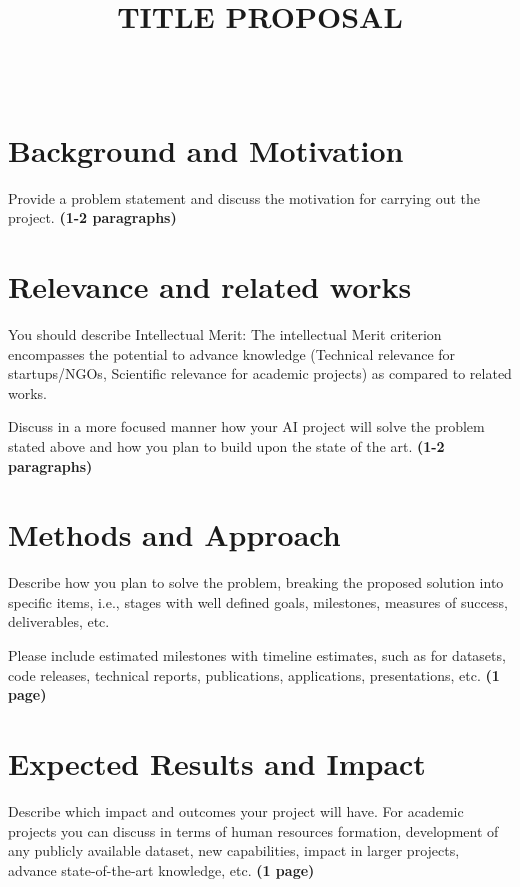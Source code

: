 \documentclass{lxaiproposal}
\title{TITLE PROPOSAL}
\author{\coord{PI FirstNAME}{PI FamilyNAME}{1} \\
       \coord{CO-PI FirstNAME}{CO-PI FamilyNAME}{2}
      }
\affil{2}{Affiliation 2, Address}}
\begin{document}
\maketitle
%
\section{Background and Motivation}
\vspace*{-3mm}

Provide a problem statement and discuss the motivation for carrying out the project. 
\textbf{(1-2 paragraphs)}

\section{Relevance and related works}
\vspace*{-3mm}

You should describe Intellectual Merit: The intellectual Merit criterion encompasses the potential to advance knowledge (Technical relevance for startups/NGOs, Scientific relevance for academic projects) as compared to related works.

Discuss in a more focused manner how your AI project will solve the problem stated above and how you plan to build upon the state of the art.
\textbf{(1-2 paragraphs)}


\section{Methods and Approach}
\vspace*{-3mm}

Describe how you plan to solve the problem, breaking the proposed solution into specific items, i.e., stages with well defined goals, milestones, measures of success, deliverables, etc. 

Please include estimated milestones with timeline estimates, such as for datasets, code releases, technical reports, publications, applications, presentations, etc. 
\textbf{(1 page)}


\section{Expected Results and Impact}
\vspace*{-3mm}

Describe which impact and outcomes your project will have. For academic projects you can discuss in terms of human resources formation, development of any publicly available dataset, new capabilities, impact in larger projects, advance state-of-the-art knowledge, etc. 
\textbf{(1 page)}
\end{document}

